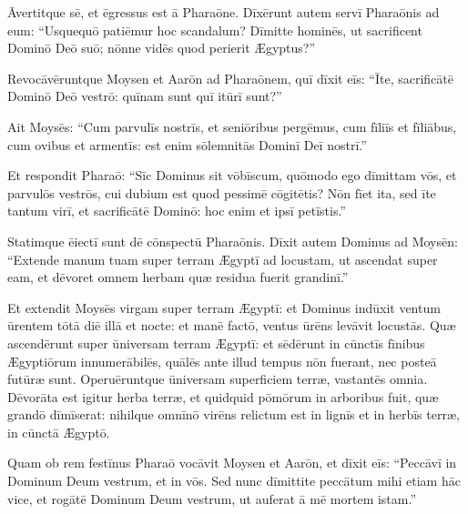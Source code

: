 Āvertitque sē, et
ēgressus est ā Pharaōne.  Dīxērunt autem servī
Pharaōnis ad eum: ``Usquequō patiēmur hoc
scandalum? Dīmitte hominēs, ut sacrificent Dominō Deō suō;
nōnne vidēs quod perierit Ægyptus?''

Revocāvēruntque Moysen et Aarōn ad
Pharaōnem, quī dīxit eīs: ``Īte, sacrificātē Dominō Deō vestrō: quīnam
sunt quī itūrī sunt?''

Ait Moysēs: ``Cum parvulīs nostrīs, et seniōribus
pergēmus, cum fīliīs et fīliābus, cum ovibus et armentīs:
est enim sōlemnitās Dominī Deī nostrī.''

Et respondit
Pharaō: ``Sīc Dominus sit vōbīscum, quōmodo ego dīmittam
vōs, et parvulōs vestrōs, cui dubium est quod pessimē cōgitētis?  Nōn
fīet ita, sed īte tantum virī, et sacrificātē Dominō: hoc enim et ipsī
petīstis.''

Statimque ēiectī sunt dē cōnspectū Pharaōnis.  Dīxit autem
Dominus ad Moysēn: ``Extende manum tuam super terram Ægyptī ad locustam, ut
ascendat super eam, et dēvoret omnem herbam quæ residua
fuerit grandinī.''

Et extendit Moysēs virgam super terram Ægyptī: et
Dominus indūxit ventum ūrentem tōtā diē illā et nocte: et manē factō,
ventus ūrēns levāvit locustās.  Quæ ascendērunt super
ūniversam terram Ægyptī: et sēdērunt in cūnctīs fīnibus Ægyptiōrum
innumerābilēs, quālēs ante illud tempus nōn fuerant, nec
posteā futūræ sunt.  Operuēruntque ūniversam superficiem terræ,
vastantēs omnia. Dēvorāta est igitur herba terræ, et
quidquid pōmōrum in arboribus fuit, quæ grandō dīmīserat:
nihilque omnīnō virēns relictum est in lignīs et
in herbīs terræ, in cūnctā Ægyptō.

Quam ob rem festīnus
Pharaō vocāvit Moysen et Aarōn, et dīxit eīs: ``Peccāvī in Dominum Deum vestrum, et in vōs.  Sed nunc
dīmittite peccātum mihi etiam hāc vice, et rogātē Dominum Deum vestrum, ut
auferat ā mē mortem istam.''

